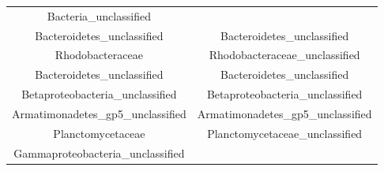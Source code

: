 \documentclass[]{article}
\begin{document}
\begin{longtable}[]{@{}cc@{}}
\begin{minipage}[t]{0.46\columnwidth}
Bacteria\_unclassified\strut
\end{minipage}\tabularnewline
\begin{minipage}[t]{0.46\columnwidth}\centering\strut
Bacteroidetes\_unclassified\strut
\end{minipage} & \begin{minipage}[t]{0.46\columnwidth}\centering\strut
Bacteroidetes\_unclassified\strut
\end{minipage}\tabularnewline
\begin{minipage}[t]{0.46\columnwidth}\centering\strut
Rhodobacteraceae\strut
\end{minipage} & \begin{minipage}[t]{0.46\columnwidth}\centering\strut
Rhodobacteraceae\_unclassified\strut
\end{minipage}\tabularnewline
\begin{minipage}[t]{0.46\columnwidth}\centering\strut
Bacteroidetes\_unclassified\strut
\end{minipage} & \begin{minipage}[t]{0.46\columnwidth}\centering\strut
Bacteroidetes\_unclassified\strut
\end{minipage}\tabularnewline
\begin{minipage}[t]{0.46\columnwidth}\centering\strut
Betaproteobacteria\_unclassified\strut
\end{minipage} & \begin{minipage}[t]{0.46\columnwidth}\centering\strut
Betaproteobacteria\_unclassified\strut
\end{minipage}\tabularnewline
\begin{minipage}[t]{0.46\columnwidth}\centering\strut
Armatimonadetes\_gp5\_unclassified\strut
\end{minipage} & \begin{minipage}[t]{0.46\columnwidth}\centering\strut
Armatimonadetes\_gp5\_unclassified\strut
\end{minipage}\tabularnewline
\begin{minipage}[t]{0.46\columnwidth}\centering\strut
Planctomycetaceae\strut
\end{minipage} & \begin{minipage}[t]{0.46\columnwidth}\centering\strut
Planctomycetaceae\_unclassified\strut
\end{minipage}\tabularnewline
\begin{minipage}[t]{0.46\columnwidth}\centering\strut
Gammaproteobacteria\_unclassified\strut
\end{minipage} & \begin{minipage}[t]{0.46\columnwidth}\centering\strut

\end{minipage}
\end{longtable}
\end{document}

